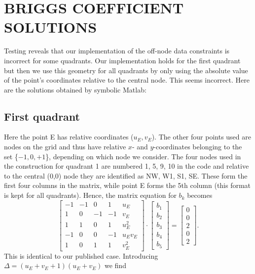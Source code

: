 \documentclass[12pt,letterpaper,margin=0.5in]{report}
\begin{document}
\section*{BRIGGS COEFFICIENT SOLUTIONS}

Testing reveals that our implementation of the off-node data constraints is incorrect
for some quadrants.  Our implementation holds for the first quadrant but then we
use this geometry for all quadrants by only using the absolute value of the point's
coordinates relative to the central node.  This seems incorrect.  Here are the
solutions obtained by symbolic Matlab:
\subsection*{First quadrant}
Here the point E has relative coordinates ($u_E, v_E$).  The other four points used are
nodes on the grid and thus have relative $x$- and $y$-coordinates belonging to the set \{$-1, 0, +1$\}, depending on
which node we consider. The four nodes used in the
construction for quadrant 1 are numbered 1, 5, 9, 10 in the code and relative to the central (0,0) node they
are identified as NW, W1, S1, SE. These form the first four columns in the matrix, while point E
forms the 5th column (this format is kept for all quadrants).  Hence, the matrix equation
for $b_k$ becomes
\begin{equation}
\left[ {\begin{array}{*{20}{r}}
{ - 1}&{ - 1}&0&1&{{u_E}}\\
1&0&{ - 1}&{ - 1}&{{v_E}}\\
1&1&0&1&{u_E^2}\\
{ - 1}&0&0&{ - 1}&{{u_E}{v_E}}\\
1&0&1&1&{v_E^2}
\end{array}} \right] \cdot \left[ {\begin{array}{*{20}{c}}
{{b_1}}\\
{{b_2}}\\
{{b_3}}\\
{{b_4}}\\
{{b_5}}
\end{array}} \right] = \left[ {\begin{array}{*{20}{c}}
0\\
0\\
2\\
0\\
2
\end{array}} \right].
\end{equation}
This is identical to our published case.  Introducing $\Delta = \left (u_E + v_E + 1 \right)\left (u_E + v_E\right)$ we find
\end{document}
